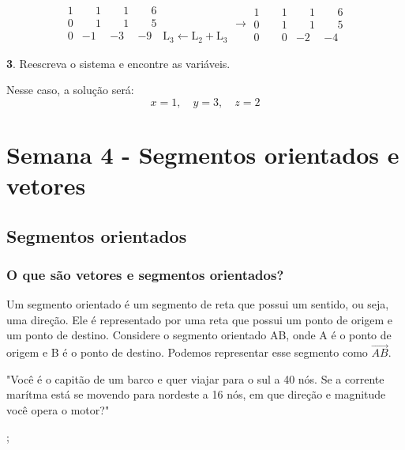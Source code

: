 \documentclass[12pt]{article}
\begin{document}
\[
    \begin{array}{rrr|l}
        1  &  \phantom{-}1  &  \phantom{-}1  &  \phantom{-}6 \\
        0  &  \phantom{-}1  &  \phantom{-}1  &  \phantom{-}5 \\
        0  &            -1  &            -3  &            -9 \quad \text{L}_3 \leftarrow \text{L}_2 + \text{L}_3
    \end{array}
\rightarrow
\begin{array}{rrr|l}
    1  &  \phantom{-}1  &  \phantom{-}1  &  \phantom{-}6 \\
    0  &  \phantom{-}1  &  \phantom{-}1  &  \phantom{-}5 \\
    0  &  \phantom{-}0  &            -2  &            -4
\end{array}
\]

\textbf{3}. Reescreva o sistema e encontre as variáveis.

Nesse caso, a solução será:
\[
x = 1, \quad y = 3, \quad z = 2
\]

\pagebreak
\section{Semana 4 - Segmentos orientados e vetores}
\subsection{Segmentos orientados}
\subsubsection{O que são vetores e segmentos orientados?}
Um segmento orientado é um segmento de reta que possui um sentido, ou seja, uma direção.
Ele é representado por uma reta que possui um ponto de origem e um ponto de destino.
Considere o segmento orientado AB, onde A é o ponto de origem e B é o ponto de destino. Podemos representar esse segmento como $\overrightarrow{AB}$.

\noindent
"Você é o capitão de um barco e quer viajar para o sul a 40 nós. Se a corrente marítma está se movendo para nordeste a 16 nós,
em que direção e magnitude você opera o motor?"

;
\end{document}
